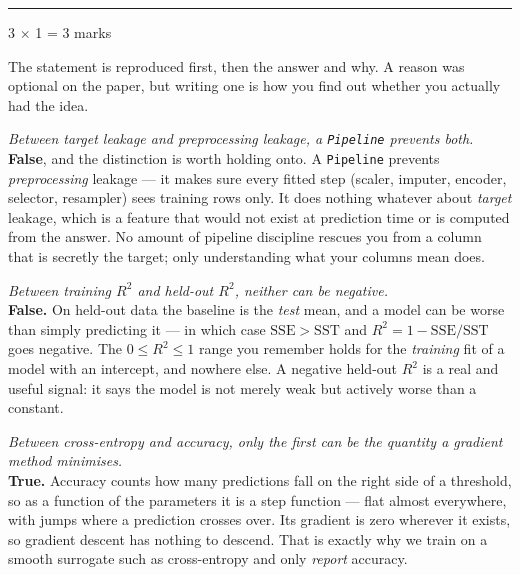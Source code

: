 \documentclass[10pt,a4paper]{article}
\newcommand{\parthead}[2]{\vspace{2pt}\noindent\rule{\linewidth}{0.4pt}\par\vspace{2pt}%
  \noindent{\bfseries Part #1}\hfill{\small #2}\par\vspace{1pt}}
\begin{document}
\parthead{C --- True or false}{3 $\times$ 1 = 3 marks}

{\small The statement is reproduced first, then the answer and why. A reason was optional on the paper, but writing one is how you find out whether you actually had the idea.}

\begin{sC}

  \item \emph{Between target leakage and preprocessing leakage, a \texttt{Pipeline} prevents both.}\\[2pt] \textbf{False}, and the distinction is worth holding onto. A \texttt{Pipeline} prevents \emph{preprocessing} leakage --- it makes sure every fitted step (scaler, imputer, encoder, selector, resampler) sees training rows only. It does nothing whatever about \emph{target} leakage, which is a feature that would not exist at prediction time or is computed from the answer. No amount of pipeline discipline rescues you from a column that is secretly the target; only understanding what your columns mean does.

  \item \emph{Between training $R^2$ and held-out $R^2$, neither can be negative.}\\[2pt] \textbf{False.} On held-out data the baseline is the \emph{test} mean, and a model can be worse than simply predicting it --- in which case $\mathrm{SSE} > \mathrm{SST}$ and $R^2 = 1 - \mathrm{SSE}/\mathrm{SST}$ goes negative. The $0 \le R^2 \le 1$ range you remember holds for the \emph{training} fit of a model with an intercept, and nowhere else. A negative held-out $R^2$ is a real and useful signal: it says the model is not merely weak but actively worse than a constant.

  \item \emph{Between cross-entropy and accuracy, only the first can be the quantity a gradient method minimises.}\\[2pt] \textbf{True.} Accuracy counts how many predictions fall on the right side of a threshold, so as a function of the parameters it is a step function --- flat almost everywhere, with jumps where a prediction crosses over. Its gradient is zero wherever it exists, so gradient descent has nothing to descend. That is exactly why we train on a smooth surrogate such as cross-entropy and only \emph{report} accuracy.

\end{sC}

\newpage
\end{document}
